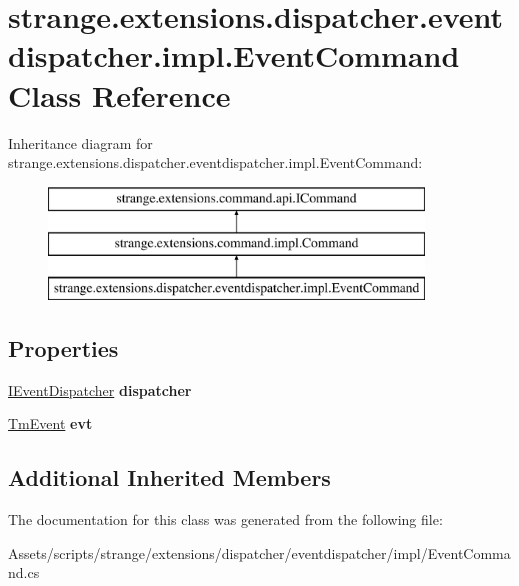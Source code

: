 \hypertarget{classstrange_1_1extensions_1_1dispatcher_1_1eventdispatcher_1_1impl_1_1_event_command}{\section{strange.\-extensions.\-dispatcher.\-eventdispatcher.\-impl.\-Event\-Command Class Reference}
\label{classstrange_1_1extensions_1_1dispatcher_1_1eventdispatcher_1_1impl_1_1_event_command}
}
Inheritance diagram for strange.\-extensions.\-dispatcher.\-eventdispatcher.\-impl.\-Event\-Command\-:\begin{figure}[H]
\begin{center}
\leavevmode
\includegraphics[height=3.000000cm]{classstrange_1_1extensions_1_1dispatcher_1_1eventdispatcher_1_1impl_1_1_event_command}
\end{center}
\end{figure}
\subsection*{Properties}
\begin{DoxyCompactItemize}
\item 
\hypertarget{classstrange_1_1extensions_1_1dispatcher_1_1eventdispatcher_1_1impl_1_1_event_command_a1a98e1f70c112230ca082ea488fdadc1}{\hyperlink{interfacestrange_1_1extensions_1_1dispatcher_1_1eventdispatcher_1_1api_1_1_i_event_dispatcher}{I\-Event\-Dispatcher} {\bfseries dispatcher}}\label{classstrange_1_1extensions_1_1dispatcher_1_1eventdispatcher_1_1impl_1_1_event_command_a1a98e1f70c112230ca082ea488fdadc1}

\item 
\hypertarget{classstrange_1_1extensions_1_1dispatcher_1_1eventdispatcher_1_1impl_1_1_event_command_ace36b51d861b27ad9013aec5fcf35dd7}{\hyperlink{classstrange_1_1extensions_1_1dispatcher_1_1eventdispatcher_1_1impl_1_1_tm_event}{Tm\-Event} {\bfseries evt}}\label{classstrange_1_1extensions_1_1dispatcher_1_1eventdispatcher_1_1impl_1_1_event_command_ace36b51d861b27ad9013aec5fcf35dd7}

\end{DoxyCompactItemize}
\subsection*{Additional Inherited Members}


The documentation for this class was generated from the following file\-:\begin{DoxyCompactItemize}
\item 
Assets/scripts/strange/extensions/dispatcher/eventdispatcher/impl/Event\-Command.\-cs\end{DoxyCompactItemize}
